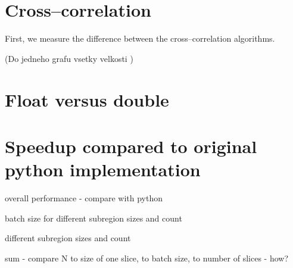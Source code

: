 \section{Cross--correlation}
First, we measure the difference between the cross--correlation algorithms.

(Do jedneho grafu vsetky velkosti )


\section{Float versus double}




\section{Speedup compared to original python implementation}

overall performance - compare with python

batch size for different subregion sizes and count

different subregion sizes and count

sum - compare N to size of one slice, to batch size, to number of slices - how?